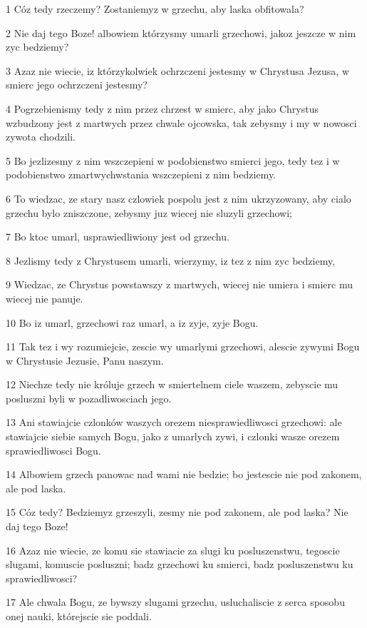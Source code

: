 \par 1 Cóz tedy rzeczemy? Zostaniemyz w grzechu, aby laska obfitowala?
\par 2 Nie daj tego Boze! albowiem którzysmy umarli grzechowi, jakoz jeszcze w nim zyc bedziemy?
\par 3 Azaz nie wiecie, iz którzykolwiek ochrzczeni jestesmy w Chrystusa Jezusa, w smierc jego ochrzczeni jestesmy?
\par 4 Pogrzebienismy tedy z nim przez chrzest w smierc, aby jako Chrystus wzbudzony jest z martwych przez chwale ojcowska, tak zebysmy i my w nowosci zywota chodzili.
\par 5 Bo jezlizesmy z nim wszczepieni w podobienstwo smierci jego, tedy tez i w podobienstwo zmartwychwstania wszczepieni z nim bedziemy.
\par 6 To wiedzac, ze stary nasz czlowiek pospolu jest z nim ukrzyzowany, aby cialo grzechu bylo zniszczone, zebysmy juz wiecej nie sluzyli grzechowi;
\par 7 Bo ktoc umarl, usprawiedliwiony jest od grzechu.
\par 8 Jezlismy tedy z Chrystusem umarli, wierzymy, iz tez z nim zyc bedziemy,
\par 9 Wiedzac, ze Chrystus powstawszy z martwych, wiecej nie umiera i smierc mu wiecej nie panuje.
\par 10 Bo iz umarl, grzechowi raz umarl, a iz zyje, zyje Bogu.
\par 11 Tak tez i wy rozumiejcie, zescie wy umarlymi grzechowi, alescie zywymi Bogu w Chrystusie Jezusie, Panu naszym.
\par 12 Niechze tedy nie króluje grzech w smiertelnem ciele waszem, zebyscie mu posluszni byli w pozadliwosciach jego.
\par 13 Ani stawiajcie czlonków waszych orezem niesprawiedliwosci grzechowi: ale stawiajcie siebie samych Bogu, jako z umarlych zywi, i czlonki wasze orezem sprawiedliwosci Bogu.
\par 14 Albowiem grzech panowac nad wami nie bedzie; bo jestescie nie pod zakonem, ale pod laska.
\par 15 Cóz tedy? Bedziemyz grzeszyli, zesmy nie pod zakonem, ale pod laska? Nie daj tego Boze!
\par 16 Azaz nie wiecie, ze komu sie stawiacie za slugi ku posluszenstwu, tegoscie slugami, komuscie posluszni; badz grzechowi ku smierci, badz posluszenstwu ku sprawiedliwosci?
\par 17 Ale chwala Bogu, ze bywszy slugami grzechu, usluchaliscie z serca sposobu onej nauki, którejscie sie poddali.
